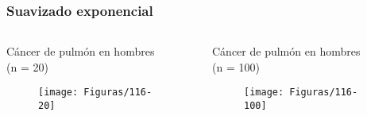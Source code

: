 \documentclass{beamer}
\begin{document}
\begin{frame}\frametitle{Suavizado exponencial}
\begin{columns}
	\begin{column}{0.5\textwidth}
		\centering Cáncer de pulmón en hombres\\ (n = 20)
		\begin{figure}
			\centering
			\texttt{[image: Figuras/116-20]}
		\end{figure}
	\end{column}
	\begin{column}{0.5\textwidth}
		\centering Cáncer de pulmón en hombres\\ (n = 100)
			\begin{figure}
				\centering
				\texttt{[image: Figuras/116-100]}
			\end{figure}
		\end{column}
\end{columns}


\end{frame}


\end{document}
